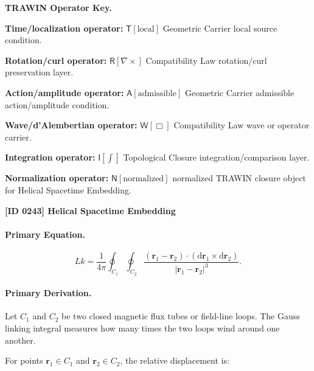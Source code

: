 \par\vspace{0.45\baselineskip}
\noindent\begin{minipage}[t]{\linewidth}
\begingroup
\small
\raggedright
\textbf{TRAWIN Operator Key.}\par
\noindent\textbf{Time/localization operator:} $\mathsf{T}\!\left[\mathrm{local}\right]$ Geometric Carrier local source condition.\par
\noindent\textbf{Rotation/curl operator:} $\mathsf{R}\!\left[\nabla\times\right]$ Compatibility Law rotation/curl preservation layer.\par
\noindent\textbf{Action/amplitude operator:} $\mathsf{A}\!\left[\mathrm{admissible}\right]$ Geometric Carrier admissible action/amplitude condition.\par
\noindent\textbf{Wave/d'Alembertian operator:} $\mathsf{W}\!\left[\Box\right]$ Compatibility Law wave or operator carrier.\par
\noindent\textbf{Integration operator:} $\mathsf{I}\!\left[\int\right]$ Topological Closure integration/comparison layer.\par
\noindent\textbf{Normalization operator:} $\mathsf{N}\!\left[\mathrm{normalized}\right]$ normalized TRAWIN closure object for Helical Spacetime Embedding.\par
\endgroup
\end{minipage}

\clearpage
\noindent\textbf{[ID 0243] Helical Spacetime Embedding}\par
\vspace{0.35em}
\paragraph{Primary Equation.}
\begin{equation}
Lk
=
\frac{1}{4\pi}
\oint_{C_1}
\oint_{C_2}
\frac{
(\mathbf{r}_1-\mathbf{r}_2)
\cdot
(\mathrm{d}\mathbf{r}_1\times \mathrm{d}\mathbf{r}_2)
}{
|\mathbf{r}_1-\mathbf{r}_2|^3
}.
\end{equation}

\paragraph{Primary Derivation.}
Let $C_1$ and $C_2$ be two closed magnetic flux tubes or field-line loops.  
The Gauss linking integral measures how many times the two loops wind around one another.

For points $\mathbf{r}_1\in C_1$ and $\mathbf{r}_2\in C_2$, the relative displacement is:

